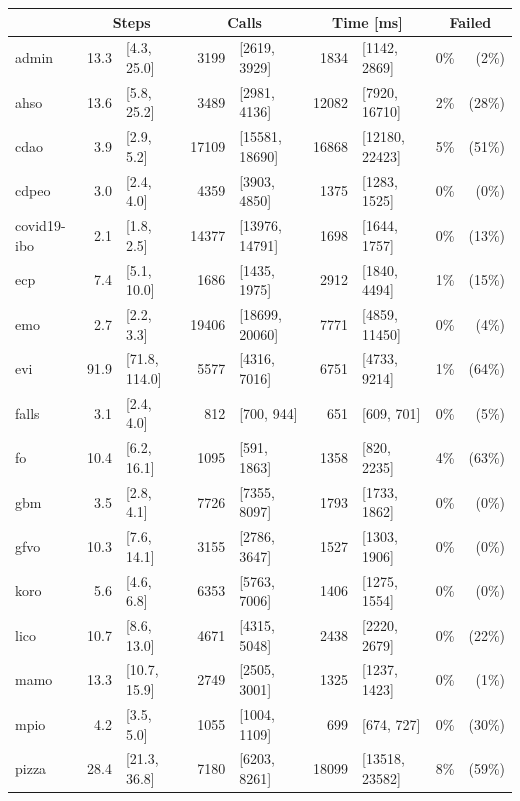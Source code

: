 \begin{table}[htbp]
  \scriptsize
  \centering
  \begin{tabular}{|l|r@{ }lr@{ }lr@{ }lr@{ }r|}
    \cline{2-9}
    \multicolumn{1}{l|}{} & \multicolumn{2}{c}{Steps} & \multicolumn{2}{c}{Calls} & \multicolumn{2}{c}{Time [ms]} & \multicolumn{2}{c|}{Failed} \\
    \hline
    admin & 13.3 & [4.3, 25.0] & 3199 & [2619, 3929] & 1834 & [1142, 2869] & 0\% & (2\%) \\
    ahso & 13.6 & [5.8, 25.2] & 3489 & [2981, 4136] & 12082 & [7920, 16710] & 2\% & (28\%) \\
    cdao & 3.9 & [2.9, 5.2] & 17109 & [15581, 18690] & 16868 & [12180, 22423] & 5\% & (51\%) \\
    cdpeo & 3.0 & [2.4, 4.0] & 4359 & [3903, 4850] & 1375 & [1283, 1525] & 0\% & (0\%) \\
    covid19-ibo & 2.1 & [1.8, 2.5] & 14377 & [13976, 14791] & 1698 & [1644, 1757] & 0\% & (13\%) \\
    ecp & 7.4 & [5.1, 10.0] & 1686 & [1435, 1975] & 2912 & [1840, 4494] & 1\% & (15\%) \\
    emo & 2.7 & [2.2, 3.3] & 19406 & [18699, 20060] & 7771 & [4859, 11450] & 0\% & (4\%) \\
    evi & 91.9 & [71.8, 114.0] & 5577 & [4316, 7016] & 6751 & [4733, 9214] & 1\% & (64\%) \\
    falls & 3.1 & [2.4, 4.0] & 812 & [700, 944] & 651 & [609, 701] & 0\% & (5\%) \\
    fo & 10.4 & [6.2, 16.1] & 1095 & [591, 1863] & 1358 & [820, 2235] & 4\% & (63\%) \\
    gbm & 3.5 & [2.8, 4.1] & 7726 & [7355, 8097] & 1793 & [1733, 1862] & 0\% & (0\%) \\
    gfvo & 10.3 & [7.6, 14.1] & 3155 & [2786, 3647] & 1527 & [1303, 1906] & 0\% & (0\%) \\
    koro & 5.6 & [4.6, 6.8] & 6353 & [5763, 7006] & 1406 & [1275, 1554] & 0\% & (0\%) \\
    lico & 10.7 & [8.6, 13.0] & 4671 & [4315, 5048] & 2438 & [2220, 2679] & 0\% & (22\%) \\
    mamo & 13.3 & [10.7, 15.9] & 2749 & [2505, 3001] & 1325 & [1237, 1423] & 0\% & (1\%) \\
    mpio & 4.2 & [3.5, 5.0] & 1055 & [1004, 1109] & 699 & [674, 727] & 0\% & (30\%) \\
    pizza & 28.4 & [21.3, 36.8] & 7180 & [6203, 8261] & 18099 & [13518, 23582] & 8\% & (59\%) \\

\end{tabular}
\end{table}

